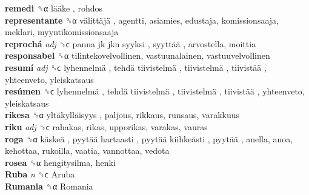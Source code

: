 \textbf{remedi} ␝α   lääke , rohdos  \\
\textbf{representante} ␝α   välittäjä , agentti, asiamies, edustaja, komissionsaaja, meklari, myyntikomissionsaaja  \\
\textbf{reprochá} \emph{adj}  ␝ϲ   panna jk jkn syyksi ,  syyttää , arvostella, moittia  \\
\textbf{responsabel} ␝α  tilintekovelvollinen, vastuunalainen, vastuuvelvollinen  \\
\textbf{resumí} \emph{adj}  ␝ϲ   lyhennelmä ,  tehdä tiivistelmä ,  tiivistelmä ,  tiivistää , yhteenveto, yleiskatsaus  \\
\textbf{resúmen} ␝ϲ   lyhennelmä ,  tehdä tiivistelmä ,  tiivistelmä ,  tiivistää , yhteenveto, yleiskatsaus  \\
\textbf{rikesa} ␝α   yltäkylläisyys , paljous, rikkaus, runsaus, varakkuus  \\
\textbf{riku} \emph{adj}  ␝ϲ  rahakas, rikas, upporikas, varakas, vauras  \\
\textbf{roga} ␝α   käskeä ,  pyytää hartaasti ,  pyytää kiihkeästi ,  pyytää , anella, anoa, kehottaa, rukoilla, vaatia, vannottaa, vedota  \\
\textbf{rosea} ␝α  hengitysilma, henki  \\
\textbf{Ruba} \emph{n}  ␝ϲ   Aruba   \\
\textbf{Rumania} ␝α   Romania   \\
